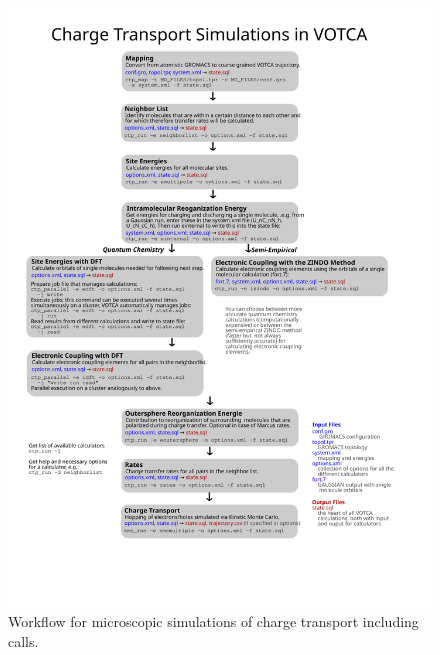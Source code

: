 \begin{figure}[p]
\includegraphics[width=\textwidth]{fig/workflow_practical/workflow_practical}
 \caption{%
   Workflow for microscopic simulations of charge transport including calls.  %
   \label{fig:workflow}}
\end{figure}


